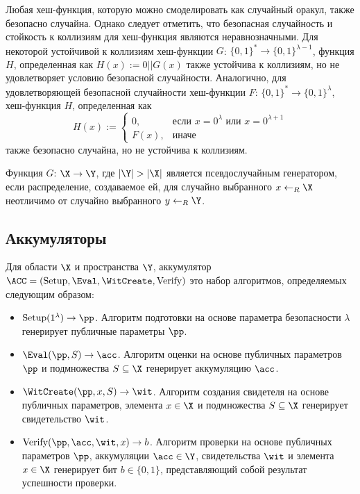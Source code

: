 Любая хеш-функция, которую можно смоделировать как случайный оракул, также безопасно случайна.
Однако следует отметить, что безопасная случайность и стойкость к коллизиям для хеш-функция являются неравнозначными.
Для некоторой устойчивой к коллизиям хеш-функции $G$: $\{0, 1\}^* \rightarrow \{0, 1\}^{\lambda - 1}$, функция $H$, определенная как $H(x) := 0 || G(x)$ также устойчива к коллизиям, но не удовлетворяет условию безопасной случайности.
Аналогично, для удовлетворяющей безопасной случайности хеш-функции $F$: $\{0, 1\}^* \rightarrow \{0, 1\}^\lambda$, хеш-функция $H$, определенная как
$$
H(x) :=
\begin{cases}
	0, & \text{если } x = 0^\lambda \text{ или } x = 0^{\lambda + 1} \\
	F(x), & \text{иначе}
\end{cases}
$$
также безопасно случайна, но не устойчива к коллизиям.

\begin{definition}
	Функция $G$: $\X \rightarrow \Y$, где $|\Y| > |\X|$ является псевдослучайным генератором, если распределение, создаваемое ей, для случайно выбранного $x \leftarrow_R \X$ неотличимо от случайно выбранного $y \leftarrow_R \Y$.
\end{definition}

\subsection{Аккумуляторы} %
Для области $\X$ и пространства $\Y$, аккумулятор $\ACC = (\Setup, \Eval, \WitCreate, \Verify)$ это набор алгоритмов, определяемых следующим образом:
\begin{itemize}
	\item $\Setup(1^\lambda) \rightarrow \pp$. Алгоритм подготовки на основе параметра безопасности $\lambda$ генерирует публичные параметры $\pp$.
	\item $\Eval(\pp, S) \rightarrow \acc$. Алгоритм оценки на основе публичных параметров $\pp$ и подмножества $S \subseteq \X$ генерирует аккумуляцию $\acc$.
	\item $\WitCreate(\pp, x, S) \rightarrow \wit$. Алгоритм создания свидетеля на основе публичных параметров, элемента $x \in \X$ и подмножества $S \subseteq \X$ генерирует свидетельство $\wit$.
	\item $\Verify(\pp, \acc, \wit, x) \rightarrow b$. Алгоритм проверки на основе публичных параметров $\pp$, аккумуляции $\acc \in \Y$, свидетельства $\wit$ и элемента $x \in \X$ генерирует бит $b \in \{0, 1\}$, представляющий собой результат успешности проверки.
\end{itemize}

